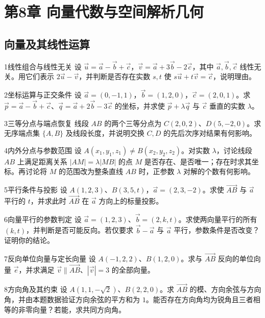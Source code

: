\section{第8章 向量代数与空间解析几何}
\subsection{向量及其线性运算}
\begin{exercise}{1}{线性组合与线性无关}
设 $\vec u=\vec a-\vec b+\vec c$，$\vec v=\vec a+3\vec b-2\vec c$，其中 $\vec a,\vec b,\vec c$ 线性无关。用它们表示 $2\vec u-\vec v$，并判断是否存在实数 $s,t$ 使 $s\vec u+t\vec v=\vec c$，说明理由。
\end{exercise}
\begin{exercise}{2}{坐标运算与正交条件}
设 $\vec a=(0,-1,1)$，$\vec b=(1,2,0)$，$\vec c=(2,0,1)$。求 $\vec p=\vec a-\vec b+\vec c$、$\vec q=\vec a+2\vec b-3\vec c$ 的坐标，并求使 $\vec p+\lambda\vec q$ 与 $\vec c$ 垂直的实数 $\lambda$。
\end{exercise}
\begin{exercise}{3}{三等分点与端点恢复}
线段 $AB$ 的两个三等分点为 $C(2,0,2)$、$D(5,-2,0)$。求无序端点集 $\{A,B\}$ 及线段长度，并说明交换 $C,D$ 的先后次序对结果有何影响。
\end{exercise}
\begin{exercise}{4}{内外分点与参数范围}
设 $A(x_1,y_1,z_1)\ne B(x_2,y_2,z_2)$。对实数 $\lambda$，讨论线段 $AB$ 上满足距离关系 $|AM|=\lambda|MB|$ 的点 $M$ 是否存在、是否唯一；存在时求其坐标。再讨论将 $M$ 的范围改为整条直线 $AB$ 时，正参数 $\lambda$ 对解的个数有何影响。
\end{exercise}
\begin{exercise}{5}{平行条件与投影}
设 $A(1,2,3)$、$B(3,5,t)$，$\vec a=(2,3,-2)$。求使 $\overrightarrow{AB}$ 与 $\vec a$ 平行的 $t$，并求此时 $\overrightarrow{AB}$ 在 $\vec a$ 方向上的标量投影。
\end{exercise}
\begin{exercise}{6}{向量平行的参数判定}
设 $\vec a=(1,2,3)$、$\vec b=(2,k,t)$。求使两向量平行的所有 $(k,t)$，并判断是否可能反向。若仅要求 $\vec b-\vec a$ 与 $\vec a$ 平行，参数条件是否改变？证明你的结论。
\end{exercise}
\begin{exercise}{7}{反向单位向量与定长向量}
设 $A(-1,2,2)$、$B(1,2,0)$。求与 $\overrightarrow{AB}$ 反向的单位向量 $\vec e$，并求满足 $\vec v\parallel\overrightarrow{AB}$、$|\vec v|=3$ 的全部向量。
\end{exercise}
\begin{exercise}{8}{方向角及其约束}
设 $A(1,1,-\sqrt2)$、$B(2,2,0)$。求 $\overrightarrow{AB}$ 的模、方向余弦与方向角，并由本题数据验证方向余弦的平方和为 $1$。能否存在方向角均为锐角且三者相等的非零向量？若能，求共同方向角。
\end{exercise}
